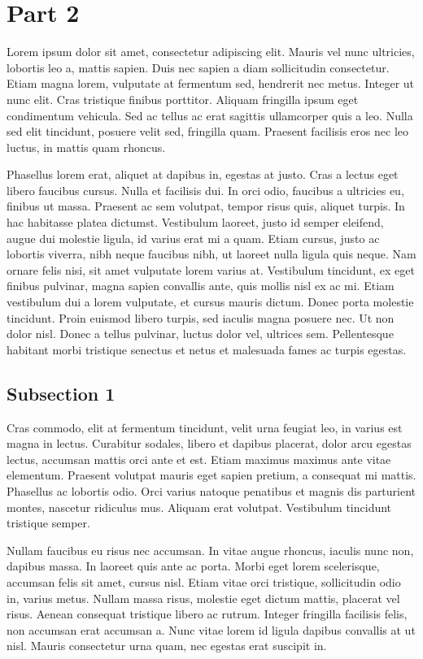 \section{Part 2}

Lorem ipsum dolor sit amet, consectetur adipiscing elit. Mauris vel nunc ultricies, lobortis leo a, mattis sapien. Duis nec sapien a diam sollicitudin consectetur. Etiam magna lorem, vulputate at fermentum sed, hendrerit nec metus. Integer ut nunc elit. Cras tristique finibus porttitor. Aliquam fringilla ipsum eget condimentum vehicula. Sed ac tellus ac erat sagittis ullamcorper quis a leo. Nulla sed elit tincidunt, posuere velit sed, fringilla quam. Praesent facilisis eros nec leo luctus, in mattis quam rhoncus.

Phasellus lorem erat, aliquet at dapibus in, egestas at justo. Cras a lectus eget libero faucibus cursus. Nulla et facilisis dui. In orci odio, faucibus a ultricies eu, finibus ut massa. Praesent ac sem volutpat, tempor risus quis, aliquet turpis. In hac habitasse platea dictumst. Vestibulum laoreet, justo id semper eleifend, augue dui molestie ligula, id varius erat mi a quam. Etiam cursus, justo ac lobortis viverra, nibh neque faucibus nibh, ut laoreet nulla ligula quis neque. Nam ornare felis nisi, sit amet vulputate lorem varius at. Vestibulum tincidunt, ex eget finibus pulvinar, magna sapien convallis ante, quis mollis nisl ex ac mi. Etiam vestibulum dui a lorem vulputate, et cursus mauris dictum. Donec porta molestie tincidunt. Proin euismod libero turpis, sed iaculis magna posuere nec. Ut non dolor nisl. Donec a tellus pulvinar, luctus dolor vel, ultrices sem. Pellentesque habitant morbi tristique senectus et netus et malesuada fames ac turpis egestas.

\subsection{Subsection 1}

Cras commodo, elit at fermentum tincidunt, velit urna feugiat leo, in varius est magna in lectus. Curabitur sodales, libero et dapibus placerat, dolor arcu egestas lectus, accumsan mattis orci ante et est. Etiam maximus maximus ante vitae elementum. Praesent volutpat mauris eget sapien pretium, a consequat mi mattis. Phasellus ac lobortis odio. Orci varius natoque penatibus et magnis dis parturient montes, nascetur ridiculus mus. Aliquam erat volutpat. Vestibulum tincidunt tristique semper.

Nullam faucibus eu risus nec accumsan. In vitae augue rhoncus, iaculis nunc non, dapibus massa. In laoreet quis ante ac porta. Morbi eget lorem scelerisque, accumsan felis sit amet, cursus nisl. Etiam vitae orci tristique, sollicitudin odio in, varius metus. Nullam massa risus, molestie eget dictum mattis, placerat vel risus. Aenean consequat tristique libero ac rutrum. Integer fringilla facilisis felis, non accumsan erat accumsan a. Nunc vitae lorem id ligula dapibus convallis at ut nisl. Mauris consectetur urna quam, nec egestas erat suscipit in.

